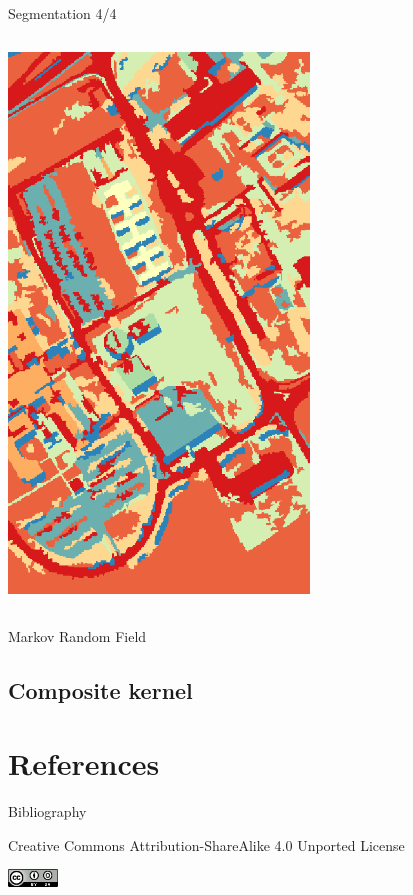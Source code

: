 \documentclass[10pt,aspectratio=1610]{beamer}
\begin{document}
\begin{frame}[label={sec:org3a4e00e}]{Segmentation 4/4}
\begin{columns}
\begin{column}{0.5\columnwidth}
\begin{center}
\includegraphics[width=0.6\textwidth]{./figures/university_tm_fusion_mv.png}
\end{center}
\end{column}
\end{columns}
\end{frame}



\begin{frame}[label={sec:orgbe4d64c}]{Markov Random Field}
\end{frame}
\subsection{Composite kernel}
\label{sec:org5b423c0}
\section{References}
\label{sec:org02f18dd}
\begin{frame}[fragile,allowframebreaks,label=]{Bibliography}
\printbibliography
\end{frame}
\begin{frame}[label={sec:org6b47b03}]{}
\begin{center}
\tiny Creative Commons Attribution-ShareAlike 4.0 Unported License
\normalsize

\begin{center}
\includegraphics[width=0.1\textwidth]{figures/cc-by-sa.png}
\end{center}
\end{center}
\end{frame}
\end{document}
